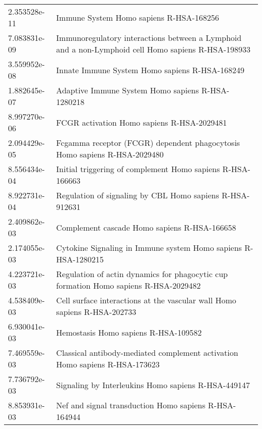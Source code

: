 \begin{longtable}{p{2.4cm}p{14.5cm}}
\bottomrule
\endlastfoot
             2.353528e-11 &                                                             Immune System Homo sapiens R-HSA-168256 \\
             7.083831e-09 &  Immunoregulatory interactions between a Lymphoid and a non-Lymphoid cell Homo sapiens R-HSA-198933 \\
             3.559952e-08 &                                                      Innate Immune System Homo sapiens R-HSA-168249 \\
             1.882645e-07 &                                                   Adaptive Immune System Homo sapiens R-HSA-1280218 \\
             8.997270e-06 &                                                          FCGR activation Homo sapiens R-HSA-2029481 \\
             2.094429e-05 &                           Fcgamma receptor (FCGR) dependent phagocytosis Homo sapiens R-HSA-2029480 \\
             8.556434e-04 &                                          Initial triggering of complement Homo sapiens R-HSA-166663 \\
             8.922731e-04 &                                            Regulation of signaling by CBL Homo sapiens R-HSA-912631 \\
             2.409862e-03 &                                                        Complement cascade Homo sapiens R-HSA-166658 \\
             2.174055e-03 &                                      Cytokine Signaling in Immune system Homo sapiens R-HSA-1280215 \\
             4.223721e-03 &                Regulation of actin dynamics for phagocytic cup formation Homo sapiens R-HSA-2029482 \\
             4.538409e-03 &                            Cell surface interactions at the vascular wall Homo sapiens R-HSA-202733 \\
             6.930041e-03 &                                                                Hemostasis Homo sapiens R-HSA-109582 \\
             7.469559e-03 &                         Classical antibody-mediated complement activation Homo sapiens R-HSA-173623 \\
             7.736792e-03 &                                                 Signaling by Interleukins Homo sapiens R-HSA-449147 \\
             8.853931e-03 &                                               Nef and signal transduction Homo sapiens R-HSA-164944 \\

\end{longtable}
